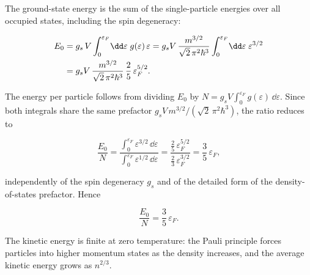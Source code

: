 The ground-state energy is the sum of the single-particle energies over all occupied states, including the spin degeneracy:
\begin{linenomath}
    \begin{align}
        E_0 &= g_s\,V\int_0^{\varepsilon_F}\!\dd\varepsilon\;g(\varepsilon)\,\varepsilon
             = g_s V\,\frac{m^{3/2}}{\sqrt{2}\,\pi^2\hbar^3}
               \int_0^{\varepsilon_F}\!\dd\varepsilon\;\varepsilon^{3/2} \notag \\
            &= g_s V\,\frac{m^{3/2}}{\sqrt{2}\,\pi^2\hbar^3}\,
               \frac{2}{5}\,\varepsilon_F^{5/2}.
    \end{align}
\end{linenomath}
The energy per particle follows from dividing $E_0$ by $N = g_s V\int_0^{\varepsilon_F} g(\varepsilon)\,\dd\varepsilon$. Since both integrals share the same prefactor $g_s V\,m^{3/2}/(\sqrt{2}\,\pi^2\hbar^3)$, the ratio reduces to
\begin{linenomath}
    \begin{equation*}
        \frac{E_0}{N}
        = \frac{\int_0^{\varepsilon_F}\!\varepsilon^{3/2}\,\dd\varepsilon}
               {\int_0^{\varepsilon_F}\!\varepsilon^{1/2}\,\dd\varepsilon}
        = \frac{\frac{2}{5}\,\varepsilon_F^{5/2}}
               {\frac{2}{3}\,\varepsilon_F^{3/2}}
        = \frac{3}{5}\,\varepsilon_F,
    \end{equation*}
\end{linenomath}
independently of the spin degeneracy $g_s$ and of the detailed form of the density-of-states prefactor. Hence
\begin{linenomath}
    \begin{equation}
        \frac{E_0}{N} = \frac{3}{5}\,\varepsilon_F.
        \label{eq:ground-state-energy}
    \end{equation}
\end{linenomath}
The kinetic energy is finite at zero temperature: the Pauli principle forces particles into higher momentum states as the density increases, and the average kinetic energy grows as $n^{2/3}$.

